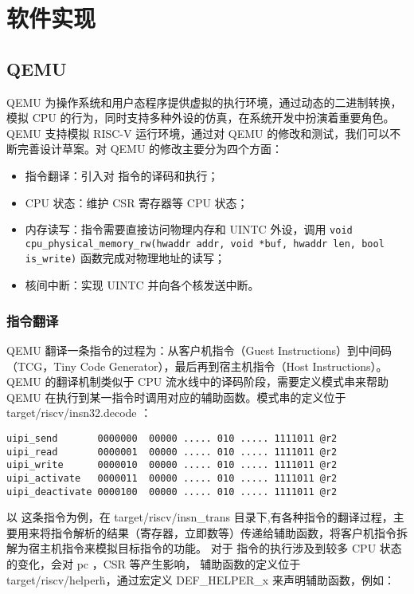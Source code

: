 
\chapter{软件实现}

\section{QEMU}

QEMU \cite{qemu} 为操作系统和用户态程序提供虚拟的执行环境，通过动态的二进制转换，模拟 CPU 的行为，同时支持多种外设的仿真，在系统开发中扮演着重要角色。
QEMU 支持模拟 RISC-V 运行环境，通过对 QEMU 的修改和测试，我们可以不断完善设计草案。对 QEMU 的修改主要分为四个方面：

\begin{itemize}
    \item 指令翻译：引入对 \Iuipi 指令的译码和执行；
    \item CPU 状态：维护 CSR 寄存器等 CPU 状态；
    \item 内存读写：\Iuipi 指令需要直接访问物理内存和 UINTC 外设，调用 \texttt{void cpu_physical_memory_rw(hwaddr addr, void *buf, hwaddr len, bool is_write)} 函数完成对物理地址的读写；
    \item 核间中断：实现 UINTC 并向各个核发送中断。
\end{itemize}

\subsection{指令翻译}

QEMU 翻译一条指令的过程为：从客户机指令（Guest Instructions）到中间码（TCG，Tiny Code Generator），最后再到宿主机指令（Host Instructions）。
QEMU 的翻译机制类似于 CPU 流水线中的译码阶段，需要定义模式串来帮助 QEMU 在执行到某一指令时调用对应的辅助函数。模式串的定义位于 target/riscv/insn32.decode ：

\begin{lstlisting}
uipi_send       0000000  00000 ..... 010 ..... 1111011 @r2
uipi_read       0000001  00000 ..... 010 ..... 1111011 @r2
uipi_write      0000010  00000 ..... 010 ..... 1111011 @r2
uipi_activate   0000011  00000 ..... 010 ..... 1111011 @r2
uipi_deactivate 0000100  00000 ..... 010 ..... 1111011 @r2
\end{lstlisting}

以 \Iuret 这条指令为例，在 target/riscv/insn\_trans 目录下,有各种指令的翻译过程，主要用来将指令解析的结果（寄存器，立即数等）传递给辅助函数，将客户机指令拆解为宿主机指令来模拟目标指令的功能。
对于 \Iuret 指令的执行涉及到较多 CPU 状态的变化，会对 pc ，CSR 等产生影响， 辅助函数的定义位于 target/riscv/helper\.h，通过宏定义 DEF\_HELPER\_x 来声明辅助函数，例如：

